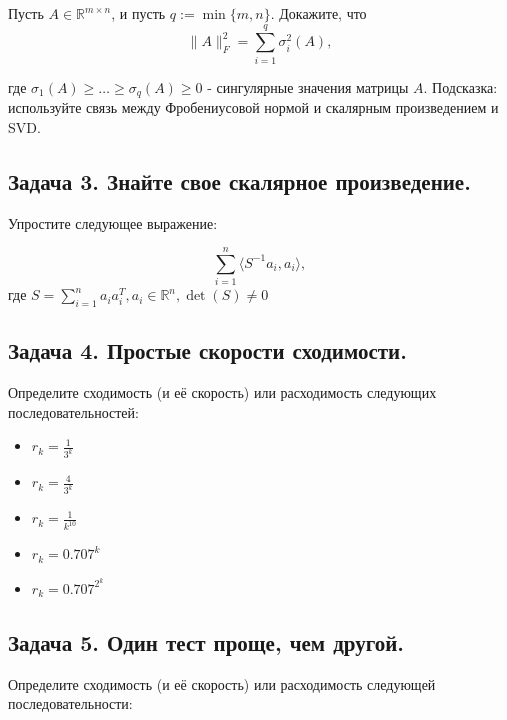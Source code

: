 \documentclass[
  russian,
  letterpaper,
  DIV=11,
  numbers=noendperiod]{scrartcl}
\providecommand{\tightlist}{%
  \setlength{\itemsep}{0pt}\setlength{\parskip}{0pt}}
\begin{document}
Пусть \(A \in \mathbb{R}^{m \times n}\), и пусть \(q := \min\{m, n\}\).
Докажите, что \[
\|A\|_F^2 = \sum_{i=1}^{q} \sigma_i^2(A) ,
\]

где \(\sigma_1(A) \geq \ldots \geq \sigma_q(A) \geq 0\) - сингулярные
значения матрицы \(A\). Подсказка: используйте связь между Фробениусовой
нормой и скалярным произведением и SVD.

\subsection{Задача 3. Знайте свое скалярное
произведение.}\label{ux437ux430ux434ux430ux447ux430-3.-ux437ux43dux430ux439ux442ux435-ux441ux432ux43eux435-ux441ux43aux430ux43bux44fux440ux43dux43eux435-ux43fux440ux43eux438ux437ux432ux435ux434ux435ux43dux438ux435.}

Упростите следующее выражение:

\[
\sum\limits_{i=1}^n \langle S^{-1} a_i, a_i \rangle,
\] где
\(S = \sum\limits_{i=1}^n a_ia_i^T, a_i \in \mathbb{R}^n, \det(S) \neq 0\)

\subsection{Задача 4. Простые скорости
сходимости.}\label{ux437ux430ux434ux430ux447ux430-4.-ux43fux440ux43eux441ux442ux44bux435-ux441ux43aux43eux440ux43eux441ux442ux438-ux441ux445ux43eux434ux438ux43cux43eux441ux442ux438.}

Определите сходимость (и её скорость) или расходимость следующих
последовательностей:

\begin{itemize}
\tightlist
\item
  \(r_{k} = \frac{1}{3^k}\)
\item
  \(r_{k} = \frac{4}{3^k}\)
\item
  \(r_{k} = \frac{1}{k^{10}}\)
\item
  \(r_{k} = 0.707^k\)
\item
  \(r_{k} = 0.707^{2^k}\)
\end{itemize}

\subsection{Задача 5. Один тест проще, чем
другой.}\label{ux437ux430ux434ux430ux447ux430-5.-ux43eux434ux438ux43d-ux442ux435ux441ux442-ux43fux440ux43eux449ux435-ux447ux435ux43c-ux434ux440ux443ux433ux43eux439.}

Определите сходимость (и её скорость) или расходимость следующей
последовательности:
\end{document}
